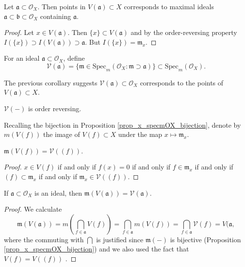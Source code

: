\documentclass[12pt]{article}
\begin{document}
\begin{corollary}
	Let $\mathfrak{a}\subset\mathcal{O}_X$. Then points in $V(\mathfrak{a})\subset X$ corresponds to maximal ideals $\mathfrak{a}\subset\mathfrak{b}\subset\mathcal{O}_X$ containing $\mathfrak{a}$.
\end{corollary}
\begin{proof}
	Let $x\in V(\mathfrak{a})$. Then $\{x\}\subset V(\mathfrak{a})$ and by the order-reversing property $I(\{x\})\supset I(V(\mathfrak{a})) \supset \mathfrak{a}$. But $I(\{x\})=\mathfrak{m}_x$. 
\end{proof}

\begin{definition}
	For an ideal $\mathfrak{a}\subset\mathcal{O}_X$, define 
	\begin{equation*}
		\mathcal{V}(\mathfrak{a}) = \{\mathfrak{m}\in\text{Spec}_m(\mathcal{O}_X : \mathfrak{m}\supset\mathfrak{a})\} \subset\text{Spec}_m(\mathcal{O}_X).
	\end{equation*}
\end{definition}

The previous corollary suggests $\mathcal{V}(\mathfrak{a}) \subset \mathcal{O}_X$ corresponds to the points of $V(\mathfrak{a})\subset X$.

\begin{corollary}
	$\mathcal{V}(-)$ is order reversing.
\end{corollary}

Recalling the bijection in Proposition \ref{prop_x_specmOX_bijection}, denote by $m(V(f))$ the image of $V(f)\subset X$ under the map $x\mapsto \mathfrak{m}_x$.

\begin{proposition}
	$\mathfrak{m}(V(f)) = \mathcal{V}((f))$.
\end{proposition}
\begin{proof}
	$x\in V(f)$ if and only if $f(x)=0$ if and only if $f\in\mathfrak{m}_x$ if and only if $(f)\subset\mathfrak{m}_x$ if and only if $\mathfrak{m}_x\in \mathcal{V}((f))$. 
\end{proof}

\begin{corollary}
	If $\mathfrak{a}\subset\mathcal{O}_X$ is an ideal, then $\mathfrak{m}(V(\mathfrak{a}))=\mathcal{V}(\mathfrak{a})$.
\end{corollary}
\begin{proof}
	We calculate
	\begin{equation*}
		\mathfrak{m}(V(\mathfrak{a})) = m\left(\bigcap_{f\in\mathfrak{a}} V(f)\right) = \bigcap_{f\in\mathfrak{a}}m(V(f)) = \bigcap_{f\in\mathfrak{a}}\mathcal{V}(f)=V(\mathfrak{a},
	\end{equation*}
	where the commuting with $\bigcap$ is justified since $\mathfrak{m}(-)$ is bijective (Proposition \ref{prop_x_specmOX_bijection}) and we also used the fact that $V(f)=V((f))$ .
\end{proof}
\end{document}
